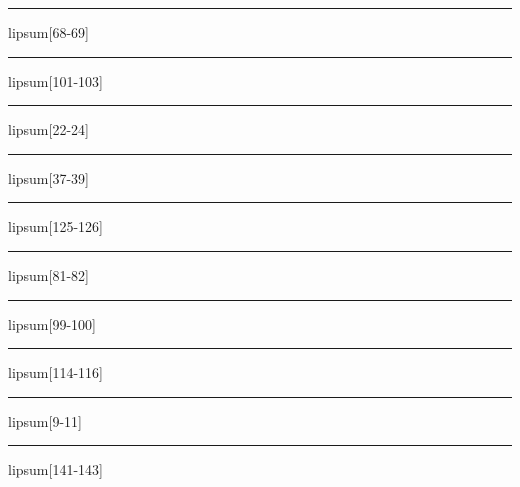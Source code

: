 \documentclass[11pt,a4paper]{article}
\begin{document}
\begin{simplewrap}
  \textcolor{magenta!21}{\rule{4.1cm}{3.6cm}}
\end{simplewrap}
lipsum[68-69]

\begin{simplewrap}
  \textcolor{red!43}{\rule{5.9cm}{4.5cm}}
\end{simplewrap}
lipsum[101-103]

\begin{simplewrap}
  \textcolor{lime!32}{\rule{5.5cm}{6.9cm}}
\end{simplewrap}
lipsum[22-24]

\begin{simplewrap}
  \textcolor{brown!17}{\rule{3.7cm}{2.9cm}}
\end{simplewrap}
lipsum[37-39]

\begin{simplewrap}
  \textcolor{olive!48}{\rule{3.4cm}{5.1cm}}
\end{simplewrap}
lipsum[125-126]

\begin{simplewrap}
  \textcolor{cyan!45}{\rule{3.5cm}{4.3cm}}
\end{simplewrap}
lipsum[81-82]

\begin{simplewrap}
  \textcolor{blue!32}{\rule{5.9cm}{5.9cm}}
\end{simplewrap}
lipsum[99-100]

\begin{simplewrap}
  \textcolor{cyan!51}{\rule{4.5cm}{7.5cm}}
\end{simplewrap}
lipsum[114-116]

\begin{simplewrap}
  \textcolor{green!46}{\rule{3.1cm}{8.1cm}}
\end{simplewrap}
lipsum[9-11]

\begin{simplewrap}
  \textcolor{magenta!28}{\rule{3.5cm}{5.7cm}}
\end{simplewrap}
lipsum[141-143]
\end{document}

